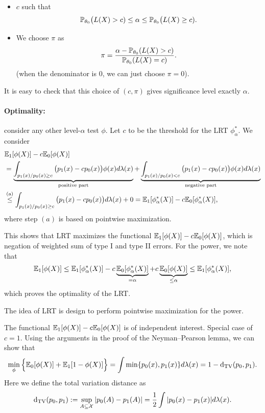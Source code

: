 \documentclass[11pt,letterpaper]{article}
\numberwithin{theorem}{lecture}
\numberwithin{proposition}{lecture}
\numberwithin{lemma}{lecture}
\numberwithin{claim}{lecture}
\numberwithin{corollary}{lecture}
\numberwithin{definition}{lecture}
\numberwithin{conjecture}{lecture}
\numberwithin{remark}{lecture}
\numberwithin{example}{lecture}
\numberwithin{equation}{lecture}
\begin{document}
\begin{itemize}
  \item $c$ such that
  \begin{align*}
    {\mathbb{P}}_{\theta_0} \big( L (X) > c) \leq \alpha \leq {\mathbb{P}}_{\theta_0} \big( L (X) \geq c).
  \end{align*}
  \item We choose $\pi$ as
  \begin{align*}
    \pi = \frac{\alpha - {\mathbb{P}}_{\theta_0} (L (X) > c)}{{\mathbb{P}}_{\theta_0} (L (X) = c)}.
  \end{align*}
  (when the denominator is $0$, we can just choose $\pi = 0$).
\end{itemize}
It is easy to check that this choice of $(c, \pi)$ gives significance level exactly $\alpha$.

\paragraph{Optimality:}  consider any other level-$\alpha$ test $\phi$. Let $c$ to be the threshold for the LRT $\phi^*_\alpha$. We consider
\begin{align*}
  &{\mathbb{E}}_1 [\phi(X)] - c {\mathbb{E}}_0 [\phi(X)] \\
  &= \underbrace{\int_{p_1 (x) / p_0 (x) \geq c} \big( p_1 (x) - c p_0 (x) \big) \phi (x) d\lambda(x)}_{\text{positive part}} + \underbrace{\int_{p_1 (x) / p_0 (x) < c} \big( p_1 (x) - c p_0 (x) \big) \phi (x) d\lambda(x)}_{\text{negative part}}\\
  &\overset{\text{(a)}}{\leq} \int_{p_1 (x) / p_0 (x) \geq c} \big( p_1 (x) - c p_0 (x) \big) d\lambda(x) + 0 = {\mathbb{E}}_1 [\phi^*_\alpha (X)] - c {\mathbb{E}}_0 [\phi^*_\alpha (X)],
\end{align*}
where step $(a)$ is based on pointwise maximization.

This shows that LRT maximizes the functional ${\mathbb{E}}_1 [\phi(X)] - c {\mathbb{E}}_0 [\phi(X)]$, which is negation of weighted sum of type I and type II errors. For the power, we note that
\begin{align*}
  {\mathbb{E}}_1 [\phi (X)] \leq {\mathbb{E}}_1 [\phi^*_\alpha (X)] - c \underbrace{{\mathbb{E}}_0 [\phi^*_\alpha (X)]}_{= \alpha} + c \underbrace{{\mathbb{E}}_0 [\phi(X)]}_{\leq \alpha} \leq {\mathbb{E}}_1 [\phi^*_\alpha (X)],
\end{align*}
which proves the optimality of the LRT.

The idea of LRT is design to perform pointwise maximization for the power.

\bigskip
The functional ${\mathbb{E}}_1 [\phi(X)] - c {\mathbb{E}}_0 [\phi(X)]$ is of independent interest. Special case of $c = 1$. Using the arguments in the proof of the Neyman--Pearson lemma, we can show that
\begin{align}
  \min_{\phi} \Big\{ {\mathbb{E}}_0 [\phi(X)] + {\mathbb{E}}_1 [1 - \phi(X)] \Big\} = \int \min \{ p_0 (x), p_1 (x) \} d\lambda(x) = 1 - \mathrm{d}_{\mathrm{TV}} (p_0, p_1).\label{eq:lec4-min-error-tv}
\end{align}
Here we define the total variation distance as
\begin{align*}
  \mathrm{d}_{\mathrm{TV}} (p_0, p_1) := \sup_{A \subseteq \mathcal{X}} |p_0 (A) - p_1 (A)| = \frac{1}{2} \int |p_0 (x) - p_1 (x)| d\lambda(x).
\end{align*}
\end{document}
